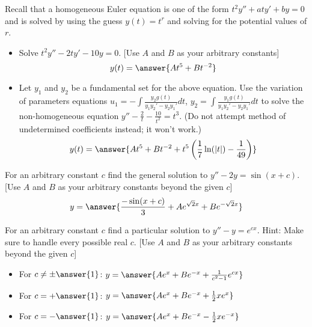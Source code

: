 \documentclass{ximera}
\begin{document}
\begin{exercise}
    Recall that a homogeneous Euler equation is one of the form $t^2y'' + aty' + by = 0$ and is solved by using the guess $y(t) = t^r$ and solving for the potential values of $r$. 
    \begin{itemize}
        \item Solve $t^2y''-2ty'-10y=0$. [Use $A$ and $B$ as your arbitrary constants]%
        \[
            y(t) = \answer{At^5 + Bt^{-2}}
        \]
        \item Let $y_1$ and $y_2$ be a fundamental set for the above equation. Use the variation of parameters equations $u_1=-\int \frac{y_2 g(t)}{y_1y_2' - y_2y_1'}dt$, $y_2=\int \frac{y_1 g(t)}{y_1y_2' - y_2y_1'}dt$ to solve the non-homogeneous equation $y''-\frac{2}{t} - \frac{10}{t^2}=t^3$. (Do not attempt method of undetermined coefficients instead; it won't work.)
        \[
            y(t) = \answer{At^5 + Bt^{-2} + t^5\left(\frac{1}{7}\ln(|t|) - \frac{1}{49}\right)}
        \]
    \end{itemize}
\end{exercise}

\begin{exercise}
    For an arbitrary constant $c$ find the general solution to $y''-2y=\sin(x+c)$. [Use $A$ and $B$ as your arbitrary constants beyond the given $c$]
    \[
        y=\answer{\frac{-\sin(x+c)}{3} + A e^{\sqrt{2}x} + B e^{-\sqrt{2}x}}
    \]
\end{exercise}

\begin{exercise}
    For an arbitrary constant $c$ find a particular solution to $y''-y=e^{cx}$.  Hint: Make sure to handle every possible real $c$. [Use $A$ and $B$ as your arbitrary constants beyond the given $c$]
    \begin{itemize}
        \item For $c\neq \pm \answer{1}$: $y=\answer{Ae^x + Be^{-x} + \frac{1}{c^2 - 1}e^{cx}}$
        \item For $c = + \answer{1}$: $y=\answer{Ae^x + Be^{-x} + \frac{1}{2}xe^x}$
        \item For $c = - \answer{1}$: $y=\answer{Ae^x + Be^{-x} - \frac{1}{2}xe^{-x}}$
    \end{itemize}
\end{exercise}
\end{document}

